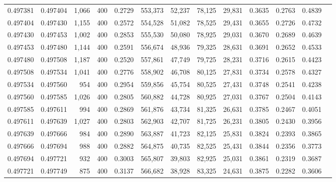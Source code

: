 \begin{tabular}{rrrrrrrrrrrrr}
0.497381 & 0.497404 &  1,066 & 400 &                                     0.2729 & 553,373 &  52,237 &  78,125 &  29,831 & 0.3635 & 0.2763 & 0.4839 \\
0.497404 & 0.497430 &  1,155 & 400 &                                     0.2572 & 554,528 &  51,082 &  78,525 &  29,431 & 0.3655 & 0.2726 & 0.4732 \\
0.497430 & 0.497453 &  1,002 & 400 &                                     0.2853 & 555,530 &  50,080 &  78,925 &  29,031 & 0.3670 & 0.2689 & 0.4639 \\
0.497453 & 0.497480 &  1,144 & 400 &                                     0.2591 & 556,674 &  48,936 &  79,325 &  28,631 & 0.3691 & 0.2652 & 0.4533 \\
0.497480 & 0.497508 &  1,187 & 400 &                                     0.2520 & 557,861 &  47,749 &  79,725 &  28,231 & 0.3716 & 0.2615 & 0.4423 \\
0.497508 & 0.497534 &  1,041 & 400 &                                     0.2776 & 558,902 &  46,708 &  80,125 &  27,831 & 0.3734 & 0.2578 & 0.4327 \\
0.497534 & 0.497560 &    954 & 400 &                                     0.2954 & 559,856 &  45,754 &  80,525 &  27,431 & 0.3748 & 0.2541 & 0.4238 \\
0.497560 & 0.497585 &  1,026 & 400 &                                     0.2805 & 560,882 &  44,728 &  80,925 &  27,031 & 0.3767 & 0.2504 & 0.4143 \\
0.497585 & 0.497611 &    994 & 400 &                                     0.2869 & 561,876 &  43,734 &  81,325 &  26,631 & 0.3785 & 0.2467 & 0.4051 \\
0.497611 & 0.497639 &  1,027 & 400 &                                     0.2803 & 562,903 &  42,707 &  81,725 &  26,231 & 0.3805 & 0.2430 & 0.3956 \\
0.497639 & 0.497666 &    984 & 400 &                                     0.2890 & 563,887 &  41,723 &  82,125 &  25,831 & 0.3824 & 0.2393 & 0.3865 \\
0.497666 & 0.497694 &    988 & 400 &                                     0.2882 & 564,875 &  40,735 &  82,525 &  25,431 & 0.3844 & 0.2356 & 0.3773 \\
0.497694 & 0.497721 &    932 & 400 &                                     0.3003 & 565,807 &  39,803 &  82,925 &  25,031 & 0.3861 & 0.2319 & 0.3687 \\
0.497721 & 0.497749 &    875 & 400 &                                     0.3137 & 566,682 &  38,928 &  83,325 &  24,631 & 0.3875 & 0.2282 & 0.3606 \\

\end{tabular}
